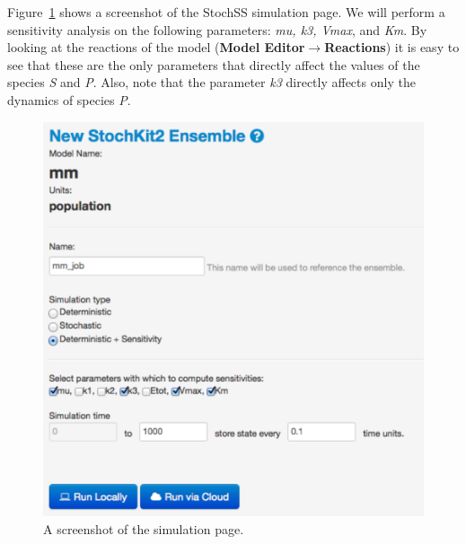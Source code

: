 Figure~\ref{fig:chapter3-sensi} shows a screenshot of the StochSS simulation page. We will perform a sensitivity analysis on the following parameters: \textit{mu, k3, Vmax}, and \textit{Km}. By looking at the reactions of the model (\textbf{Model Editor}$\to$\textbf{Reactions}) it is easy to see that these are the only parameters that directly affect the values of the species \textit{S} and \textit{P}. Also, note that the parameter \textit{k3} directly affects only the dynamics of species \textit{P}.

\begin{figure}[!htb]
\centering
\includegraphics[scale=0.64]{T2/sensi.pdf}
\caption{\label{fig:chapter3-sensi}A screenshot of the simulation page.}
\end{figure}

